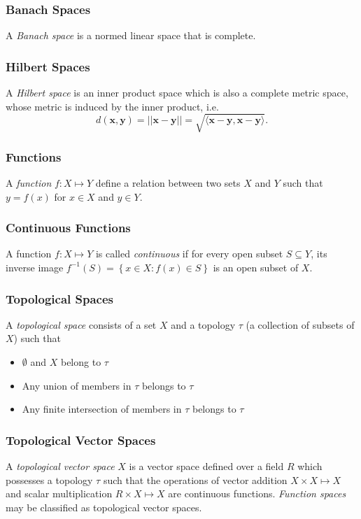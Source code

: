 \subsubsection*{Banach Spaces} A \textit{Banach space} is a normed linear space that is complete.

\subsubsection*{Hilbert Spaces} A \textit{Hilbert space} is an inner product space which is also a complete metric space, whose metric is induced by the inner product, i.e.
\begin{equation}
  d(\mathbf{x},\mathbf{y}) = || \mathbf{x} - \mathbf{y} || = \sqrt{\langle \mathbf{x} - \mathbf{y}, \mathbf{x} - \mathbf{y} \rangle}.
\end{equation}

\subsubsection*{Functions} A \textit{function} $f \colon X \mapsto Y$ define a relation between two sets $X$ and $Y$ such that $y = f(x)$ for $x \in X$ and $y \in Y$.

\subsubsection*{Continuous Functions} A function $f \colon X \mapsto Y$ is called \textit{continuous} if for every open subset $S \subseteq Y$, its inverse image $f^{-1} (S) = \left\{ x \in X : f(x) \in S \right\}$ is an open subset of $X$.

\subsubsection*{Topological Spaces} A \textit{topological space} consists of a set $X$ and a topology $\tau$ (a collection of subsets of $X$) such that
\begin{itemize}
  \item $\emptyset$ and $X$ belong to $\tau$
  \item Any union of members in $\tau$ belongs to $\tau$
  \item Any finite intersection of members in $\tau$ belongs to $\tau$
\end{itemize}

\subsubsection*{Topological Vector Spaces} A \textit{topological vector space} $X$ is a vector space defined over a field $R$ which possesses a topology $\tau$ such that the operations of vector addition $X \times X \mapsto X$ and scalar multiplication $R \times X \mapsto X$ are continuous functions. \textit{Function spaces} may be classified as topological vector spaces.

